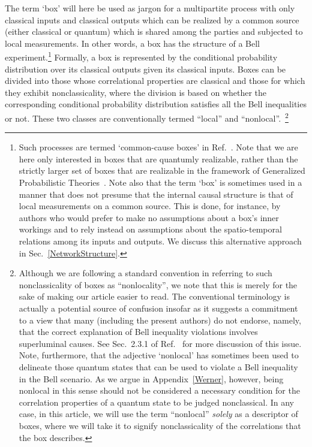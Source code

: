 \documentclass[prx,11pt,letterpaper,twocolumn,accepted=2023-11-27]{quantumarticle}
\theoremstyle{plain}
\theoremstyle{definition}
\begin{document}
The term `box' will here be used as jargon for a  multipartite process with only classical inputs and classical outputs   which can be realized by a common source 
    (either classical or quantum) which is shared among the parties and subjected to local measurements.  In other words, a box has the structure of a Bell experiment.\footnote{Such processes are termed `common-cause boxes' in Ref.~\cite{wolfe2020quantifying}.  Note that we are here only interested in boxes that are quantumly realizable, rather than the strictly larger set of boxes that are realizable in the framework of Generalized Probabilistic Theories~\cite{barrettGPT,hardy01}.
    Note also that the term `box' is sometimes used in a manner that does not presume that the internal causal structure is that of local measurements on a common source. This is done, for instance, by authors who would prefer to make no assumptions about a box's inner workings and to rely instead on assumptions about the spatio-temporal relations among its inputs and outputs.  We discuss this alternative approach in Sec.~\ref{NetworkStructure}.
}
Formally, a box is represented by the conditional probability distribution over its classical outputs given its classical inputs. Boxes can be divided into those whose correlational properties are classical and those for which they exhibit nonclassicality, where the division is based on whether the corresponding conditional probability distribution satisfies  all the Bell inequalities or not.  These two classes are conventionally termed ``local'' and ``nonlocal''.~\footnote{\label{footnote:nolocality}Although we are following a standard convention in referring to such nonclassicality of boxes as 
  ``nonlocality'', we note that this is merely for the sake of making our article easier to read. 
The conventional terminology is actually a potential source of confusion insofar as it suggests  a commitment to a view that many (including the present authors) do not endorse, namely, that the correct explanation of Bell inequality violations
involves superluminal causes.  See Sec.~2.3.1 of Ref.~\cite{wolfe2020quantifying} for more discussion of this issue.
 Note, furthermore, that the adjective `nonlocal' has sometimes been used to delineate those quantum states that can be used to violate a Bell inequality in the Bell scenario. As we argue in Appendix~\ref{Werner},
  however, being nonlocal in this sense should not be considered a necessary condition for the correlation properties of a quantum state to be judged nonclassical. 
 In any case, in this article, we will use the term ``nonlocal'' {\em solely} as a descriptor of boxes, where we will take it to signify nonclassicality of the correlations that the box describes.  }
  
\end{document}

